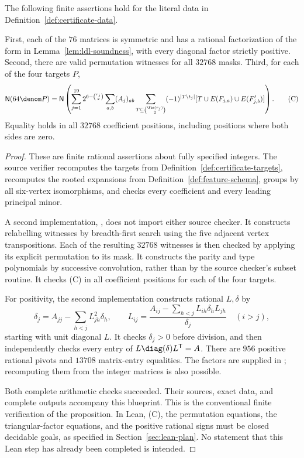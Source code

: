 \begin{proposition}
\label{prop:checked-data}
\proved The following finite assertions hold for the literal data in
Definition~\ref{def:certificate-data}.

First, each of the $76$ matrices is symmetric and has a rational factorization of the form
in Lemma~\ref{lem:ldl-soundness}, with every diagonal factor strictly positive.
Second, there are valid permutation witnesses for all $32768$ masks.  Third, for each of
the four targets $P$,
\[
 \mathsf N(64\denom P)=
 \mathsf N\left(\sum_{j=1}^{19}2^{6-\binom{r_j}2}
 \sum_{a,b}(A_j)_{ab}\sum_{T\subseteq\binom{\Fin(r_j)}2}
 (-1)^{|T\setminus t_j|}[T\cup E(F_{j,a})\cup E(F'_{j,b})]\right).
 \tag{C}
\]
Equality holds in all $32768$ coefficient positions, including positions where both sides
are zero.
\end{proposition}
\begin{proof}
These are finite rational assertions about fully specified integers.  The source verifier
recomputes the targets from Definition~\ref{def:certificate-targets}, recomputes the rooted
expansions from Definition~\ref{def:feature-schema}, groups by all six-vertex isomorphisms,
and checks every coefficient and every leading principal minor.

A second implementation, , does not import either source
checker.  It constructs relabelling witnesses by breadth-first search using the five adjacent
vertex transpositions.  Each of the resulting $32768$ witnesses is then checked by applying
its explicit permutation to its mask.  It constructs the parity and type polynomials by
successive convolution, rather than by the source checker's subset routine.  It checks (C)
in all coefficient positions for each of the four targets.

For positivity, the second implementation constructs rational $L,\delta$ by
\[
 \delta_j=A_{jj}-\sum_{h<j}L_{jh}^2\delta_h,
 \qquad
 L_{ij}=\frac{A_{ij}-\sum_{h<j}L_{ih}\delta_hL_{jh}}{\delta_j}\quad(i>j),
\]
starting with unit diagonal $L$.  It checks $\delta_j>0$ before division, and then independently
checks every entry of $L\diag(\delta)L^{\mathsf T}=A$.  There are $956$ positive rational
pivots and $13708$ matrix-entry equalities.  The factors are supplied in
; recomputing them from the integer matrices is also possible.

Both complete arithmetic checks succeeded.  Their sources, exact data, and complete
outputs accompany this blueprint.  This is the conventional finite verification of the
proposition.  In Lean, (C), the permutation equations, the triangular-factor equations, and
the positive rational signs must be closed decidable goals, as specified in
Section~\ref{sec:lean-plan}.  No statement that this Lean step has already been completed
is intended.
\end{proof}

